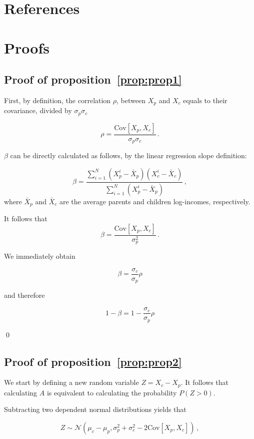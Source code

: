 \documentclass[final,10pt,5p,twocolumn,authoryear]{elsarticle}
\newcommand{\preflong}[1]{proposition~\ref{prop:#1}}
\newcommand{\be}{\begin{equation}}
\newcommand{\ee}{\end{equation}}
\numberwithin{equation}{section}
\begin{document}
\section*{References}




\appendix

\section{Proofs}

\subsection{Proof of \preflong{prop1}}

First, by definition, the correlation $\rho$, between $X_p$ and $X_c$ equals to their covariance, divided by $\sigma_p\sigma_c$

\be
\rho = \frac{\text{Cov}\left[X_p,X_c\right]}{\sigma_p\sigma_c}\,.
\ee

$\beta$ can be directly calculated as follows, by the linear regression slope definition:

\be
\beta = \frac{\sum_{i=1}^{N} {\left(X_p^i - \bar{X}_p\right)\left(X_c^i - \bar{X}_c\right)}}{\sum_{i=1}^{N} {\left(X_p^i - \bar{X}_p\right)}}\,,
\ee
where $\bar{X}_p$ and $\bar{X}_c$ are the average parents and children log-incomes, respectively.

It follows that 
\be
\beta = \frac{\text{Cov}\left[X_p,X_c\right]}{\sigma_p^2}\,.
\ee

We immediately obtain

\be
\beta = \frac{\sigma_c}{\sigma_p}\rho
\ee

and therefore

\be
1-\beta = 1-\frac{\sigma_c}{\sigma_p}\rho
\ee

\qed

\subsection{Proof of \preflong{prop2}}

We start by defining a new random variable $Z = X_c-X_p$. It follows that calculating $A$ is equivalent to calculating the probability $P\left(Z>0\right)$.

Subtracting two dependent normal distributions yields that

\be
Z \sim \mathcal{N}\left(\mu_c - \mu_p,\sigma_p^2 + \sigma_c^2 - 2\text{Cov}\left[X_p,X_c\right]\right)\,,
\ee
\end{document}
